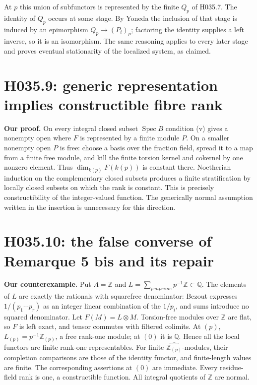 At $p$ this union of subfunctors is represented by the finite $Q_p$ of
H035.7. The identity of $Q_p$ occurs at some stage. By Yoneda the
inclusion of that stage is induced by an epimorphism $Q_p\to(P_i)_p$;
factoring the identity supplies a left inverse, so it is an isomorphism.
The same reasoning applies to every later stage and proves eventual
stationarity of the localized system, as claimed.

\section{H035.9: generic representation implies constructible fibre rank}
\textbf{Our proof.} On every integral closed subset $\operatorname{Spec}B$
condition (v) gives a nonempty open where $F$ is represented by a finite
module $P$. On a smaller nonempty open $P$ is free: choose a basis over
the fraction field, spread it to a map from a finite free module, and
kill the finite torsion kernel and cokernel by one nonzero element.
Thus $\dim_{k(p)}F(k(p))$ is constant there. Noetherian induction on
the complementary closed subsets produces a finite stratification by
locally closed subsets on which the rank is constant. This is precisely
constructibility of the integer-valued function. The generically normal
assumption written in the insertion is unnecessary for this direction.

\section{H035.10: the false converse of Remarque 5 bis and its repair}
\textbf{Our counterexample.} Put $A=\mathbb Z$ and
$L=\sum_{p\ {
m prime}}p^{-1}\mathbb Z\subset\mathbb Q$.
The elements of $L$ are exactly the rationals with squarefree
denominator: Bezout expresses $1/(p_1\cdots p_r)$ as an integer
linear combination of the $1/p_i$, and sums introduce no squared
denominator. Let $F(M)=L\otimes M$. Torsion-free modules over $\mathbb Z$
are flat, so $F$ is left exact, and tensor commutes with filtered colimits.
At $(p)$, $L_{(p)}=p^{-1}\mathbb Z_{(p)}$, a free rank-one module;
at $(0)$ it is $\mathbb Q$. Hence all the local functors are finite
rank-one representables. For finite $\widehat{\mathbb Z_{(p)}}$-modules,
their completion comparisons are those of the identity functor, and
finite-length values are finite. The corresponding assertions at $(0)$
are immediate. Every residue-field rank is one, a constructible function.
All integral quotients of $\mathbb Z$ are normal.

